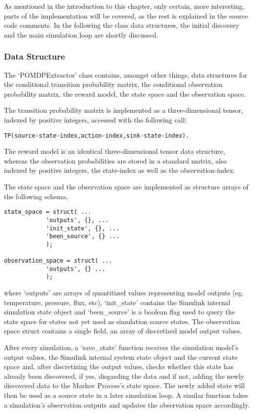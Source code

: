 As mentioned in the introduction to this chapter, only certain, more interesting, parts of the implementation will be covered, as the rest is explained in the source code comments. In the following the class data structures, the initial discovery and the main simulation loop are shortly discussed.

\subsubsection{Data Structure}
The `POMDPExtractor' class contains, amongst other things, data structures for the conditional transition probability matrix, the conditional observation probability matrix, the reward model, the state space and the observation space.

The transition probability matrix is implemented as a three-dimensional tensor, indexed by positive integers, accessed with the following call:
\begin{verbatim}
TP(source-state-index,action-index,sink-state-index).
\end{verbatim}

The reward model is an identical three-dimensional tensor data structure, whereas the observation probabilities are stored in a standard matrix, also indexed by positive integers, the state-index as well as the observation-index.

The state space and the observation space are implemented as structure arrays of the following schema,

\begin{verbatim}
state_space = struct( ...
            'outputs', {}, ...
            'init_state', {}, ...
            'been_source', {} ...
            );

observation_space = struct( ...
            'outputs', {} ...
            );
\end{verbatim}

where `outputs' are arrays of quantitized values representing model outputs (eg. temperature, pressure, flux, etc), `init\_state' contains the Simulink internal simulation state object and `been\_source' is a boolean flag used to query the state space for states not yet used as simulation source states. The observation space struct contains a single field, an array of discretized model output values.

After every simulation, a `save\_state' function receives the simulation model's output values, the Simulink internal system state object and the current state space and, after discretizing the output values, checks whether this state has already been discovered, if yes, disgarding the data and if not, adding the newly discovered data to the Markov Process's state space. The newly added state will then be used as a source state in a later simulation loop. A similar function takes a simulation's observation outputs and updates the observation space accordingly.


